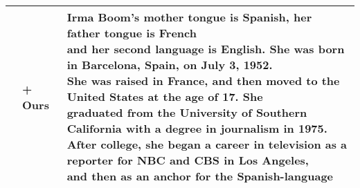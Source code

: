 \begin{table*}[!htbp]
{\begin{tabular}{c | l | l }
     & + Ours & \makecell[l]{Irma Boom's mother tongue is Spanish, her father tongue is French\\ and her second language is English. She was born in Barcelona, Spain, on July 3, 1952.\\ She was raised in France, and then moved to the United States at the age of 17. She \\graduated from the University of Southern California with a degree in journalism in 1975. \\After college, she began a career in television as a reporter for NBC and CBS in Los Angeles,\\ and then as an anchor for the Spanish-language} \\


     
\bottomrule
\end{tabular}}
\label{tab:gen_text}
\end{table*}